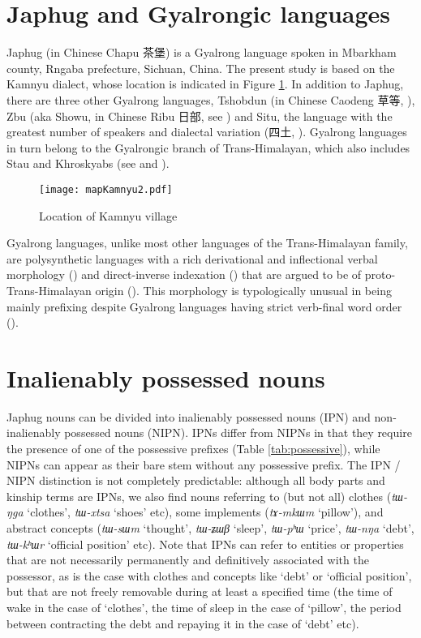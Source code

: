 \documentclass[oldfontcommands,oneside,a4paper,11pt]{article}
\newcommand{\ipa}[1]{{\phon\textit{#1}}} %
\newcommand{\zh}[1]{{\cn #1}}
\begin{document}
 \section{Japhug and Gyalrongic languages} 
Japhug (in Chinese Chapu \zh{茶堡}) is a Gyalrong language spoken in Mbarkham county, Rngaba prefecture, Sichuan, China. The present study is based on the Kamnyu dialect, whose location is indicated in Figure \ref{fig:kamnyu}. In addition to Japhug, there are three other Gyalrong languages, Tshobdun (in Chinese Caodeng \zh{草等}, \citealt{jackson03caodeng}), Zbu (aka Showu, in Chinese Ribu \zh{日部}, see \citealt{jackson04showu, gongxun14agreement}) and Situ, the language with the greatest number of speakers and dialectal variation (\zh{四土}, \citealt{linxr93jiarongen, huangsun02, prins11kyomkyo}). Gyalrong languages in turn belong to the Gyalrongic branch of Trans-Himalayan, which also includes Stau and Khroskyabs (see \citealt{jackson00puxi} and \citealt{lai15person}).

\begin{figure}[H]
\centering
\label{fig:kamnyu}
\caption{Location of Kamnyu village}
\texttt{[image: mapKamnyu2.pdf]}
\end{figure}

Gyalrong languages, unlike most other languages of the Trans-Himalayan family, are polysynthetic languages with a rich derivational and inflectional verbal morphology (\citealt{jacques12incorp, jackson14morpho}) and direct-inverse indexation (\citealt{delancey81direction, jackson02rentongdengdi, jacques10inverse, gongxun14agreement}) that are argued to be of proto-Trans-Himalayan origin (\citealt{delancey10agreement, jacques12agreement}). This morphology is typologically unusual in being mainly prefixing despite Gyalrong languages having strict verb-final word order (\citealt{jacques13harmonization}).

 \section{Inalienably possessed nouns} 
Japhug nouns can be divided into inalienably possessed nouns (IPN) and non-inalienably possessed nouns (NIPN). IPNs differ from NIPNs in that they require the presence of one of the possessive prefixes (Table \ref{tab:possessive}), while NIPNs can appear as their bare stem without any possessive prefix. The IPN / NIPN distinction is not completely predictable: although all body parts and kinship terms are IPNs, we also find nouns referring to (but not all) clothes (\ipa{tɯ-ŋga} `clothes', \ipa{tɯ-xtsa} `shoes' etc), some implements (\ipa{tɤ-mkɯm} `pillow'), and abstract concepts (\ipa{tɯ-sɯm} `thought', \ipa{tɯ-ʑɯβ} `sleep', \ipa{tɯ-pʰɯ} `price', \ipa{tɯ-nŋa} `debt', \ipa{tɯ-kʰɯr} `official position' etc). Note that IPNs can refer to entities or properties that are not necessarily permanently and definitively associated with the possessor, as is the case with clothes and concepts like `debt' or `official position', but that are not freely removable during at least a specified time (the time of wake in the case of `clothes', the time of sleep in the case of `pillow', the period between contracting the debt and repaying it in the case of `debt' etc).
\end{document}
